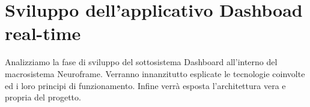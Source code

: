 \chapter{Sviluppo dell’applicativo Dashboad real-time}
Analizziamo la fase di sviluppo del sottosistema Dashboard all'interno del macrosistema Neuroframe.\newline
Verranno innanzitutto esplicate le tecnologie coinvolte ed i loro principi di funzionamento.\newline
Infine verrà esposta l'architettura vera e propria del progetto.
